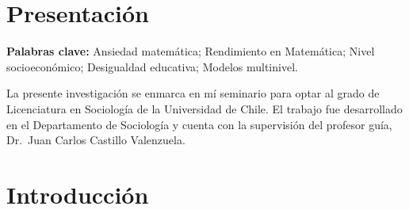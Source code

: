 \documentclass[
  spanish,
  a4paper,
  oneside]{scrbook}
\newif\iffacsofigexists
\begin{document}
\frontmatter
\pagestyle{scrheadings}

\setcounter{tocdepth}{2} %
\tableofcontents
\iffacsofigexists
  \cleardoublepage
  \listoffigures
\fi
\cleardoublepage


\mainmatter
{}

\chapter*{Presentación}\label{presentaciuxf3n}


\small\textbf{Palabras clave: } Ansiedad matemática; Rendimiento en
Matemática; Nivel socioeconómico; Desigualdad educativa; Modelos
multinivel. \normalsize

La presente investigación se enmarca en mí seminario para optar al grado
de Licenciatura en Sociología de la Universidad de Chile. El trabajo fue
desarrollado en el Departamento de Sociología y cuenta con la
supervisión del profesor guía, Dr.~Juan Carlos Castillo Valenzuela.


\chapter{Introducción}\label{introducciuxf3n}
\end{document}
